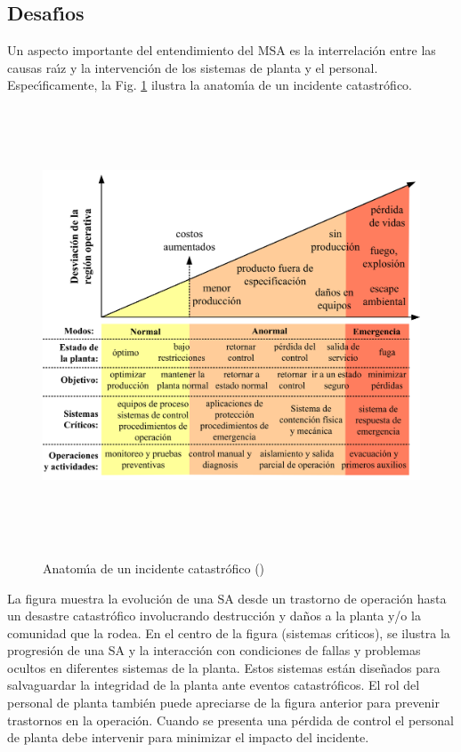 \subsection{Desaf{\'\i}os}
Un aspecto importante del entendimiento del MSA es la interrelaci{\'o}n entre las causas ra{\'\i}z y la intervenci{\'o}n
de los sistemas de planta y el personal. Espec{\'\i}ficamente, la Fig. \ref{f0_3} ilustra la anatom{\'\i}a de un
incidente catastr{\'o}fico.
\begin{figure}[t]
  \centering
  \includegraphics[width=15cm,height=13cm]{Ch0/f0_3}\\
  \caption{Anatom{\'\i}a de un incidente catastr{\'o}fico (\cite{ASM}\textcolor{myblue}{\circledR})}\label{f0_3}
\end{figure}

La figura muestra la evoluci{\'o}n de una SA desde un trastorno de operaci{\'o}n hasta un desastre catastr{\'o}fico
involucrando destrucci{\'o}n y da{\~n}os a la planta y/o la comunidad que la rodea. En el centro de la figura
(sistemas cr{\'\i}ticos), se ilustra la progresi{\'o}n de una SA y la interacci{\'o}n con condiciones de fallas y
problemas ocultos en diferentes sistemas de la planta. Estos sistemas est{\'a}n dise{\~n}ados para salvaguardar la
integridad de la planta ante eventos catastr{\'o}ficos. El rol del personal de planta tambi{\'e}n puede apreciarse
de la figura anterior para prevenir trastornos en la operaci{\'o}n. Cuando se presenta una p{\'e}rdida de control el
personal de planta debe intervenir para minimizar el impacto del incidente.

